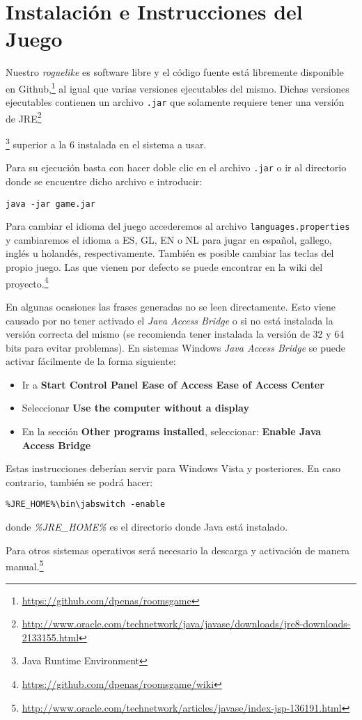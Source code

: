 \chapter{Instalación e Instrucciones del Juego}
\label{ref:instalacion}

Nuestro \textit{roguelike} es software libre y el código fuente está libremente disponible en Github,\footnote{\url{https://github.com/dpenas/roomsgame}} al igual que varias versiones ejecutables del mismo. Dichas versiones ejecutables contienen un archivo \texttt{.jar} que solamente requiere tener una versión de JRE\footnote{\url{http://www.oracle.com/technetwork/java/javase/downloads/jre8-downloads-2133155.html}}{\footnote{Java Runtime Environment} superior a la 6 instalada en el sistema a usar. 

Para su ejecución basta con hacer doble clic en el archivo \texttt{.jar} o ir al directorio donde se encuentre dicho archivo e introducir:

\begin{lstlisting}[label=lst:bash,caption=Comando para la ejecución del videojuego]
java -jar game.jar
\end{lstlisting}

Para cambiar el idioma del juego accederemos al archivo \texttt{languages.properties} y cambiaremos el idioma a ES, GL, EN o NL para jugar en español, gallego, inglés u holandés, respectivamente. También es posible cambiar las teclas del propio juego. Las que vienen por defecto se puede encontrar en la wiki del proyecto.\footnote{\url{https://github.com/dpenas/roomsgame/wiki}}

En algunas ocasiones las frases generadas no se leen directamente. Esto viene causado por no tener activado el \textit{Java Access Bridge} o si no está instalada la versión correcta del mismo (se recomienda tener instalada la versión de 32 y 64 bits para evitar problemas). 
En sistemas Windows \textit{Java Access Bridge} se puede activar fácilmente de la forma siguiente:

\begin{itemize}
\item Ir a \textbf{Start \textrightarrow Control Panel \textrightarrow Ease of Access \textrightarrow Ease of Access Center}
\item Seleccionar \textbf{Use the computer without a display}
\item En la sección \textbf{Other programs installed}, seleccionar: \textbf{Enable Java Access Bridge}
\end{itemize}

\noindent Estas instrucciones deberían servir para Windows Vista y posteriores. En caso contrario, también se podrá hacer:

\begin{verbatim}
%JRE_HOME%\bin\jabswitch -enable
\end{verbatim}

donde \textit{\%JRE\_HOME\%} es el directorio donde Java está instalado.

\noindent Para otros sistemas operativos será necesario la descarga y activación de manera manual.\footnote{\url{http://www.oracle.com/technetwork/articles/javase/index-jsp-136191.html}}}
